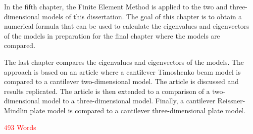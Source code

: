 \documentclass[../main.tex]{subfiles}
\begin{document}
In the fifth chapter, the Finite Element Method is applied to the two and three-dimensional models of this dissertation. The goal of this chapter is to obtain a numerical formula that can be used to calculate the eigenvalues and eigenvectors of the models in preparation for the final chapter where the models are compared.

The last chapter compares the eigenvalues and eigenvectors of the models. The approach is based on an article where a cantilever Timoshenko beam model is compared to a cantilever two-dimensional model. The article is discussed and results replicated. The article is then extended to a comparison of a two-dimensional model to a three-dimensional model. Finally, a cantilever Reissner-Mindlin plate model is compared to a cantilever three-dimensional plate model.

\textcolor{red}{493 Words}
\end{document}
